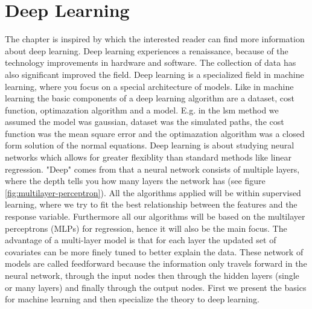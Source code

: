 
\chapter{Deep Learning} %

\label{Chapter4} %

The chapter is inspired by \parencite{Goodfellow-et-al-2016} which the interested reader can find more information about deep learning. Deep learning experiences a renaissance, because of the technology improvements in hardware and software. The collection of data has also significant improved the field. Deep learning is a specialized field in machine learning, where you focus on a special architecture of models. Like in machine learning the basic components of a deep learning algorithm are a dataset, cost function, optimazation algorithm and a model. E.g. in the lsm method we assumed the model was gaussian, dataset was the simulated paths, the cost function was the mean square error and the optimazation algorithm was a closed form solution of the normal equations. Deep learning is about studying neural networks which allows for greater flexiblity than standard methods like linear regression. "Deep" comes from that a neural network consists of multiple layers, where the depth tells you how many layers the network has (see figure \ref{fig:multilayer-perceptron}). All the algorithms applied will be within supervised learning, where we try to fit the best relationship between the features and the response variable. Furthermore all our algorithms will be based on the multilayer perceptrons (MLPs) for regression, hence it will also be the main focus. The advantage of a multi-layer model is that for each layer the updated set of covariates can be more finely tuned to better explain the data. These network of models are called feedforward because the information only travels forward in the neural network, through the input nodes then through the hidden layers (single or many layers) and finally through the output nodes. First we present the basics for machine learning and then specialize the theory to deep learning.

